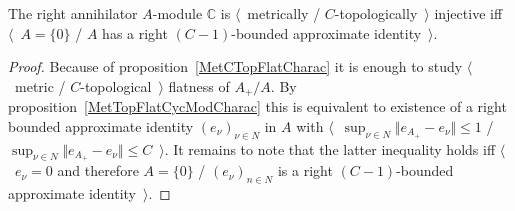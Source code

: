 \begin{proposition}\label{MetTopInjModCCharac} The right annihilator $A$-module
$\mathbb{C}$ is $\langle$~metrically / $C$-topologically~$\rangle$ injective iff
$\langle$~$A= \{0 \}$ / $A$ has a right $(C-1)$-bounded approximate
identity~$\rangle$.
\end{proposition}
\begin{proof} Because of proposition~\ref{MetCTopFlatCharac} it is enough 
to study $\langle$~metric / $C$-topological~$\rangle$ flatness of $A_+/A$. By
proposition~\ref{MetTopFlatCycModCharac} this is equivalent to existence of a 
right bounded approximate identity ${(e_\nu)}_{\nu\in N}$ in $A$ with
$\langle$~$\sup_{\nu\in N}\Vert e_{A_+}-e_\nu\Vert\leq 1$ / 
$\sup_{\nu\in N}\Vert e_{A_+}-e_\nu\Vert\leq C$~$\rangle$. 
It remains to note that the latter inequality holds 
iff $\langle$~$e_\nu=0$ and therefore $A= \{0 \}$ /
${(e_\nu)}_{n\in N}$ is a right $(C-1)$-bounded approximate identity~$\rangle$.
\end{proof}

